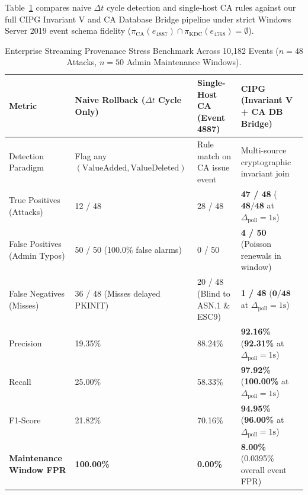 Table~\ref{tab:false_positive_ablation} compares naive $\Delta t$ cycle detection and single-host CA rules against our full CIPG Invariant V and CA Database Bridge pipeline under strict Windows Server 2019 event schema fidelity ($\pi_{\text{CA}}(e_{4887}) \cap \pi_{\text{KDC}}(e_{4768}) = \emptyset$).

\begin{table}[htbp]
\centering
\small
\caption{Enterprise Streaming Provenance Stress Benchmark Across 10,182 Events ($n=48$ Attacks, $n=50$ Admin Maintenance Windows).}
\label{tab:false_positive_ablation}
\begin{tabularx}{\textwidth}{lXXX}
\toprule
\textbf{Metric} & \textbf{Naive Rollback ($\Delta t$ Cycle Only)} & \textbf{Single-Host CA (Event 4887)} & \textbf{CIPG (Invariant V + CA DB Bridge)} \\
\midrule
Detection Paradigm & Flag any $(\text{ValueAdded}, \text{ValueDeleted})$ & Rule match on CA issue event & Multi-source cryptographic invariant join \\
True Positives (Attacks) & 12 / 48 & 28 / 48 & \textbf{47 / 48} ($\mathbf{48 / 48}$ at $\Delta_{\text{poll}}=1\text{s}$) \\
False Positives (Admin Typos) & 50 / 50 (100.0\% false alarms) & 0 / 50 & \textbf{4 / 50} (Poisson renewals in window) \\
False Negatives (Misses) & 36 / 48 (Misses delayed PKINIT) & 20 / 48 (Blind to ASN.1 \& ESC9) & \textbf{1 / 48} ($\mathbf{0 / 48}$ at $\Delta_{\text{poll}}=1\text{s}$) \\
Precision & 19.35\% & 88.24\% & \textbf{92.16\%} (\textbf{92.31\%} at $\Delta_{\text{poll}}=1\text{s}$) \\
Recall & 25.00\% & 58.33\% & \textbf{97.92\%} (\textbf{100.00\%} at $\Delta_{\text{poll}}=1\text{s}$) \\
F1-Score & 21.82\% & 70.16\% & \textbf{94.95\%} (\textbf{96.00\%} at $\Delta_{\text{poll}}=1\text{s}$) \\
\textbf{Maintenance Window FPR} & \textbf{100.00\%} & \textbf{0.00\%} & \textbf{8.00\%} (0.0395\% overall event FPR) \\
\bottomrule
\end{tabularx}
\end{table}

